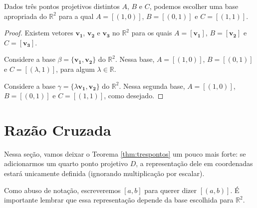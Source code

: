 \begin{thm}\label{thm:trespontos}
  Dados três pontos projetivos distintos \(A\), \(B\) e \(C\), podemos escolher uma base apropriada do \(\mathbb{R}^2\) para a qual \(A = [(1, 0)]\),  \(B = [(0, 1)]\) e \(C = [(1, 1)]\).
\end{thm}
\begin{proof}
  Existem vetores \(\mathbf{v_1}\), \(\mathbf{v_2}\) e \(\mathbf{v_3}\) no \(\mathbb{R}^2\) para os quais \(A = [\mathbf{v_1}]\), \(B = [\mathbf{v_2}]\) e \(C = [\mathbf{v_3}]\).

  Considere a base \(\beta = \{\mathbf{v_1}, \mathbf{v_2}\}\) do \(\mathbb{R}^2\). Nessa base, \(A = [(1, 0)]\),  \(B = [(0, 1)]\) e \(C = [(\lambda, 1)]\), para algum \(\lambda \in \mathbb{R}\).

  Considere a base \(\gamma = \{\lambda\mathbf{v_1}, \mathbf{v_2}\}\) do \(\mathbb{R}^2\). Nessa segunda base, \(A = [(1, 0)]\),  \(B = [(0, 1)]\) e \(C = [(1, 1)]\), como desejado.
\end{proof}

\section{Razão Cruzada}

Nessa seção, vamos deixar o Teorema \ref{thm:trespontos} um pouco mais forte: se adicionarmos um quarto ponto projetivo \(D\), a representação dele em coordenadas estará unicamente definida (ignorando multiplicação por escalar).

Como abuso de notação, escreveremos \([a, b]\) para querer dizer \([(a, b)]\). É importante lembrar que essa representação depende da base escolhida para \(\mathbb{R}^2\).

